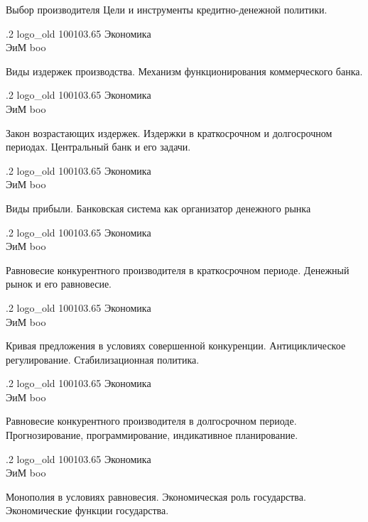 \documentclass[
	12pt,
	a4paper,
	]
	{article}
\newcommand{\shapkFull}{
	\shapk
		{.2}
		{logo_old}
		{100103.65}
		{Экономика\\}
		{ЭиМ}
		{boo}
}
\begin{document}
\z 	Выбор производителя
 \medskip
\z 	Цели и инструменты кредитно-денежной политики.
 \medskip

\newpage


\shapkFull
\setcounter{zad}{0}

\z 	Виды издержек производства.
 \medskip
\z 	Механизм функционирования коммерческого банка.
 \medskip

\newpage


\shapkFull
\setcounter{zad}{0}

\z 	Закон возрастающих издержек.  Издержки в краткосрочном и долгосрочном периодах.
 \medskip
\z 	Центральный банк и его задачи.
 \medskip

\newpage


\shapkFull
\setcounter{zad}{0}

\z 	Виды прибыли.
 \medskip
\z 	Банковская система как организатор денежного рынка
 \medskip

\newpage


\shapkFull
\setcounter{zad}{0}

\z 	Равновесие конкурентного производителя в краткосрочном периоде.
 \medskip
\z 	Денежный рынок и его равновесие.
 \medskip

\newpage


\shapkFull
\setcounter{zad}{0}

\z 	Кривая предложения в условиях совершенной конкуренции.
 \medskip
\z 	Антициклическое регулирование. Стабилизационная политика.
 \medskip

\newpage


\shapkFull
\setcounter{zad}{0}

\z 	Равновесие конкурентного производителя в долгосрочном периоде.
 \medskip
\z 	Прогнозирование, программирование, индикативное планирование.
 \medskip

\newpage


\shapkFull
\setcounter{zad}{0}

\z 	Монополия в условиях равновесия.
 \medskip
\z 	Экономическая роль государства. Экономические функции государства.
 \medskip

\newpage
\end{document}
